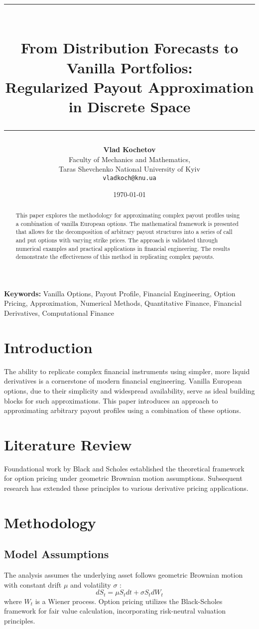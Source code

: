 \documentclass[12pt]{article}
\title{\rule{\textwidth}{4pt}\\
\textbf{From Distribution Forecasts to Vanilla Portfolios: \\[0.2cm]
Regularized Payout Approximation in Discrete Space}\\[0.2cm]
\rule{\textwidth}{2pt}}
\author{\small \textbf{Vlad Kochetov} \\
    \small Faculty of Mechanics and Mathematics, \\
    \small Taras Shevchenko National University of Kyiv \\
    \small \texttt{vladkoch@knu.ua}
}
\date{\today}
\providecommand{\keywords}[1]{\textbf{Keywords:} #1}
\begin{document}
\maketitle

\begin{abstract}
This paper explores the methodology for approximating complex payout profiles using a
combination of vanilla European options. The mathematical framework is presented that
allows for the decomposition of arbitrary payout structures into a series of call and
put options with varying strike prices. The approach is validated through numerical
examples and practical applications in financial engineering. The results demonstrate
the effectiveness of this method in replicating complex payouts.
\end{abstract}

\newpage

\keywords{
    \small{
        Vanilla Options, 
        Payout Profile, 
        Financial Engineering, 
        Option Pricing, 
        Approximation, 
        Numerical Methods,
        Quantitative Finance,
        Financial Derivatives,
        Computational Finance
    }
}

\section{Introduction}
The ability to replicate complex financial instruments using simpler, more liquid
derivatives is a cornerstone of modern financial engineering. Vanilla European options,
due to their simplicity and widespread availability, serve as ideal building blocks
for such approximations. This paper introduces an approach to approximating arbitrary
payout profiles using a combination of these options.

\section{Literature Review}
Foundational work by Black and Scholes \cite{black1973pricing} established the theoretical framework for option pricing under geometric Brownian motion assumptions. Subsequent research has extended these principles to various derivative pricing applications.

\section{Methodology}
\subsection{Model Assumptions}
The analysis assumes the underlying asset follows geometric Brownian motion with constant drift $\mu$ and volatility $\sigma$ \cite{black1973pricing}:
\begin{equation}
dS_t = \mu S_t dt + \sigma S_t dW_t
\end{equation}
where $W_t$ is a Wiener process. Option pricing utilizes the Black-Scholes framework \cite{black1973pricing} for fair value calculation, incorporating risk-neutral valuation principles.
\end{document}
